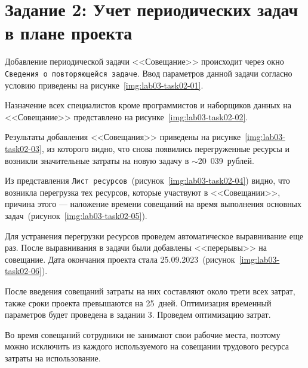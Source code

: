 \section{Задание 2: Учет периодических задач в плане проекта}

Добавление периодической задачи <<Совещание>> происходит через окно
\texttt{Сведения о повторяющейся задаче}. Ввод параметров данной задачи согласно
условию приведены на рисунке~\ref{img:lab03-task02-01}.


Назначение всех специалистов кроме программистов и наборщиков данных на
<<Совещание>> представлено на рисунке~\ref{img:lab03-task02-02}.


Результаты добавления <<Совещания>> приведены на
рисунке~\ref{img:lab03-task02-03}, из которого видно, что снова появились
перегруженные ресурсы и возникли значительные затраты на новую задачу в
$\sim$20~039~рублей.


Из представления \texttt{Лист ресурсов}~(рисунок~\ref{img:lab03-task02-04})
видно, что возникла перегрузка тех ресурсов, которые участвуют в <<Совещании>>,
причина этого --- наложение времени совещаний на время выполнения основных
задач~(рисунок~\ref{img:lab03-task02-05}).



Для устранения перегрузки ресурсов проведем автоматическое выравнивание еще
раз.  После выравнивания в задачи были добавлены <<перерывы>> на совещание.
Дата окончания проекта стала 25.09.2023~(рисунок~\ref{img:lab03-task02-06}).


После введения совещаний затраты на них составляют около трети всех затрат,
также сроки проекта превышаются на 25~дней. Оптимизация временный параметров
будет проведена в задании 3. Проведем оптимизацию затрат.

Во время совещаний сотрудники не занимают свои рабочие места, поэтому можно
исключить из каждого используемого на совещании трудового ресурса затраты на
использование.

